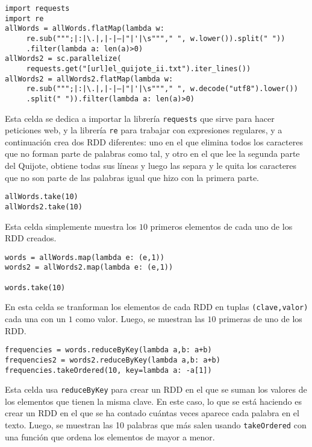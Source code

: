 \documentclass[11pt]{article}
\def\inline{\lstinline[basicstyle=\ttfamily,keywordstyle={}]}
\begin{document}
\begin{verbatim}
import requests
import re
allWords = allWords.flatMap(lambda w: 
     re.sub(""";|:|\.|,|-|–|"|'|\s"""," ", w.lower()).split(" "))
     .filter(lambda a: len(a)>0)
allWords2 = sc.parallelize(
     requests.get("[url]el_quijote_ii.txt").iter_lines())
allWords2 = allWords2.flatMap(lambda w: 
     re.sub(""";|:|\.|,|-|–|"|'|\s"""," ", w.decode("utf8").lower())
     .split(" ")).filter(lambda a: len(a)>0)
\end{verbatim}

Esta celda se dedica a importar la librería \inline{requests} que sirve para hacer peticiones web, y la librería \inline{re} para trabajar con expresiones regulares, y a continuación crea dos RDD diferentes: uno en el que elimina todos los caracteres que no forman parte de palabras como tal, y otro en el que lee la segunda parte del Quijote, obtiene todas sus líneas y luego las separa y le quita los caracteres que no son parte de las palabras igual que hizo con la primera parte.

\begin{verbatim}
allWords.take(10)
allWords2.take(10)
\end{verbatim}

Esta celda simplemente muestra los $10$ primeros elementos de cada uno de los RDD creados.


\begin{verbatim}
words = allWords.map(lambda e: (e,1))
words2 = allWords2.map(lambda e: (e,1))

words.take(10)
\end{verbatim}

En esta celda se tranforman los elementos de cada RDD en tuplas \inline{(clave,valor)} cada una con un $1$ como valor. Luego, se muestran las $10$ primeras de uno de los RDD.

\begin{verbatim}
frequencies = words.reduceByKey(lambda a,b: a+b)
frequencies2 = words2.reduceByKey(lambda a,b: a+b)
frequencies.takeOrdered(10, key=lambda a: -a[1])
\end{verbatim}

Esta celda usa \inline{reduceByKey} para crear un RDD en el que se suman los valores de los elementos que tienen la misma clave. En este caso, lo que se está haciendo es crear un RDD en el que se ha contado cuántas veces aparece cada palabra en el texto. Luego, se muestran las 10 palabras que más salen usando \inline{takeOrdered} con una función que ordena los elementos de mayor a menor.
\end{document}
